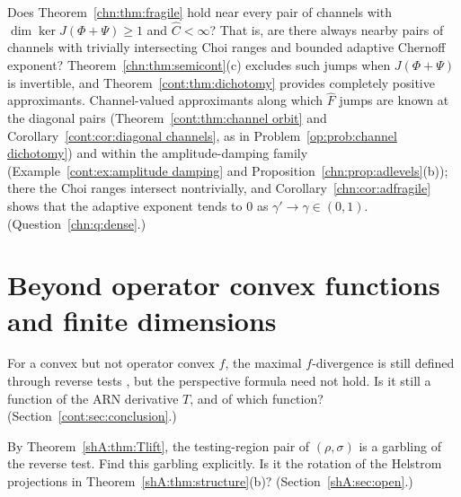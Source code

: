 \begin{problem}\label{op:prob:dense}
Does Theorem~\ref{chn:thm:fragile} hold near every pair of channels with $\dim\ker J(\Phi+\Psi)\ge1$ and $\widehat C<\infty$? That is, are there always nearby pairs of channels with trivially intersecting Choi ranges and bounded adaptive Chernoff exponent? Theorem~\ref{chn:thm:semicont}(c) excludes such jumps when $J(\Phi+\Psi)$ is invertible, and Theorem~\ref{cont:thm:dichotomy} provides completely positive approximants. Channel-valued approximants along which $\widehat F$ jumps are known at the diagonal pairs (Theorem~\ref{cont:thm:channel orbit} and Corollary~\ref{cont:cor:diagonal channels}, as in Problem~\ref{op:prob:channel dichotomy}) and within the amplitude-damping family (Example~\ref{cont:ex:amplitude damping} and Proposition~\ref{chn:prop:adlevels}(b)); there the Choi ranges intersect nontrivially, and Corollary~\ref{chn:cor:adfragile} shows that the adaptive exponent tends to $0$ as $\gamma'\to\gamma\in(0,1)$. (Question~\ref{chn:q:dense}.)
\end{problem}

\section{Beyond operator convex functions and finite dimensions}\label{op:sec:beyond}

\begin{question}\label{op:q:convex}
For a convex but not operator convex $f$, the maximal $f$-divergence is still defined through reverse tests \cite{Matsumoto2018newf}, but the perspective formula need not hold. Is it still a function of the ARN derivative $T$, and of which function? (Section~\ref{cont:sec:conclusion}.)
\end{question}

\begin{problem}\label{op:prob:garbling}
By Theorem~\ref{shA:thm:Tlift}, the testing-region pair of $(\rho,\sigma)$ is a garbling of the reverse test. Find this garbling explicitly. Is it the rotation of the Helstrom projections in Theorem~\ref{shA:thm:structure}(b)? (Section~\ref{shA:sec:open}.)
\end{problem}

